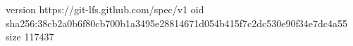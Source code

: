 version https://git-lfs.github.com/spec/v1
oid sha256:38cb2a0b6f80cb700b1a3495e28814671d054b415f7c2dc530e90f34e7dc4a55
size 117437
